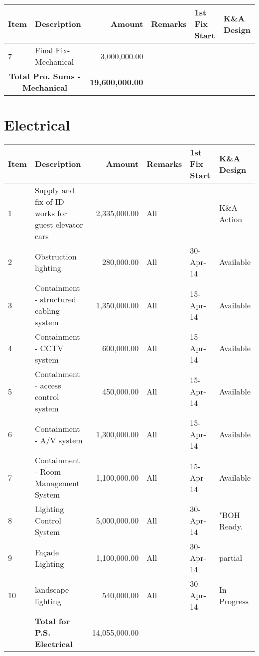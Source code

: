 \documentclass{book}
\begin{document}
\bgroup
\raggedright\small
\setcounter{step}{0}
\begin{longtable}{lp{3.4cm}rlll}
\toprule
\textbf{Item}	& \textbf{Description}	 &\textbf{Amount}&\textbf{Remarks}	&\textbf{1st Fix Start}	&\textbf{K\&A Design}\\
\midrule
7	&Final Fix-Mechanical	 &3,000,000.00 		&&&\\

\multicolumn{2}{c}{\textbf{Total Pro. Sums - Mechanical}}	 &\textbf{19,600,000.00} &&&			\\

\end{longtable}
\egroup

\section{Electrical}

\raggedright\small
\setcounter{step}{0}
\begin{longtable}{lp{3.4cm}rlll}
\toprule
\textbf{Item}	& \textbf{Description}	 &\textbf{Amount}&\textbf{Remarks}	&\textbf{1st Fix Start}	&\textbf{K\&A Design}\\
\midrule
1	&Supply and fix of ID works for guest elevator cars	 &2,335,000.00 	&All	&	&K\&A Action\\
2	&Obstruction lighting	 &280,000.00 	&All	&30-Apr-14	&Available\\
3	&Containment - structured cabling system	 &1,350,000.00 	&All	&15-Apr-14	&Available\\ 
4	&Containment - CCTV system	 &600,000.00 	&All	&15-Apr-14	&Available \\
5	&Containment - access control system	 &450,000.00 &All	&15-Apr-14	&Available\\
6	&Containment - A/V system	 &1,300,000.00 	&All	&15-Apr-14	&Available \\
7	&Containment - Room Management System	 &1,100,000.00 	&All	&15-Apr-14	&Available\\
8	&Lighting Control System	 &5,000,000.00 	&All	&30-Apr-14	&"BOH Ready.\\ 
9	&Façade Lighting 	 &1,100,000.00 	&All	&30-Apr-14	&partial\\
10	&landscape lighting 	& 540,000.00 	&All	&30-Apr-14	&In Progress\\
\midrule
	&\textbf{Total for P.S. Electrical}	 &14,055,000.00 &&&\\

\bottomrule
\end{longtable}
\end{document}
